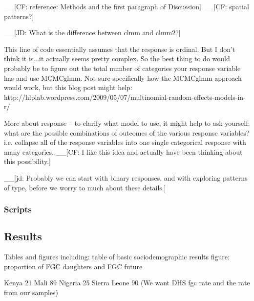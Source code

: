 \documentclass[12pt,]{article}
\begin{document}
\_\_{[}CF: reference: Methods and the first paragraph of Discussion\cite{Chia14}{]}
\_\_{[}CF: spatial patterns?{]}

\_\_{[}JD: What is the difference between clmm and clmm2?{]}

This line of code essentially assumes that the response is ordinal. But I don't think it is...it actually seems pretty complex. So the best thing to do would probably be to figure out the total number of categories your response variable has and use MCMCglmm. Not sure specifically how the MCMCglmm approach would work, but this blog post might help: http://hlplab.wordpress.com/2009/05/07/multinomial-random-effects-models-in-r/

More about response -- to clarify what model to use, it might help to ask yourself: what are the possible combinations of outcomes of the various response variables?  i.e. collapse all of the response variables into one single categorical response with many categories. \_\_{[}CF: I like this idea and actually have been thinking about this possibility.{]}

\_\_{[}jd: Probably we can start with binary responses, and with exploring patterns of type, before we worry to much about these details.{]}

\subsubsection{Scripts}\label{scripts}

\subsection{Results}\label{results-1}

Tables and figures including:
table of basic sociodemographic results
figure:  proportion of FGC daughters and FGC future

Kenya 21%
Mali 89%
Nigeria 25%
Sierra Leone 90%
(We want DHS fgc rate and the rate from our samples)
\end{document}
